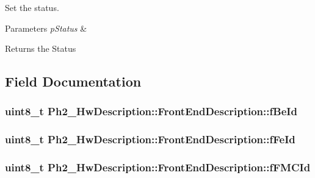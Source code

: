 Set the status. 


\begin{DoxyParams}{Parameters}
{\em p\-Status} & \\
\hline
\end{DoxyParams}
\begin{DoxyReturn}{Returns}
the Status 
\end{DoxyReturn}


\subsection{Field Documentation}
\hypertarget{class_ph2___hw_description_1_1_front_end_description_a9ad4c11d4b00f0e1325843cfceac2e7c}{
\subsubsection[{f\-Be\-Id}]{\setlength{\rightskip}{0pt plus 5cm}uint8\-\_\-t Ph2\-\_\-\-Hw\-Description\-::\-Front\-End\-Description\-::f\-Be\-Id}}\label{class_ph2___hw_description_1_1_front_end_description_a9ad4c11d4b00f0e1325843cfceac2e7c}
\hypertarget{class_ph2___hw_description_1_1_front_end_description_a11b388f8d0f3259e5355779b36e75d9f}{
\subsubsection[{f\-Fe\-Id}]{\setlength{\rightskip}{0pt plus 5cm}uint8\-\_\-t Ph2\-\_\-\-Hw\-Description\-::\-Front\-End\-Description\-::f\-Fe\-Id}}\label{class_ph2___hw_description_1_1_front_end_description_a11b388f8d0f3259e5355779b36e75d9f}
\hypertarget{class_ph2___hw_description_1_1_front_end_description_a4f17ee7ee9d0d395c9f7da5ab3c8f424}{
\subsubsection[{f\-F\-M\-C\-Id}]{\setlength{\rightskip}{0pt plus 5cm}uint8\-\_\-t Ph2\-\_\-\-Hw\-Description\-::\-Front\-End\-Description\-::f\-F\-M\-C\-Id}}\label{class_ph2___hw_description_1_1_front_end_description_a4f17ee7ee9d0d395c9f7da5ab3c8f424}
